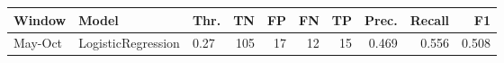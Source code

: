 \begin{tabular}{lllrrrrrrr}
\toprule
Window & Model & Thr. & TN & FP & FN & TP & Prec. & Recall & F1 \\
\midrule
May-Oct & LogisticRegression & 0.27 & 105 & 17 & 12 & 15 & 0.469 & 0.556 & 0.508 \\
\bottomrule
\end{tabular}
